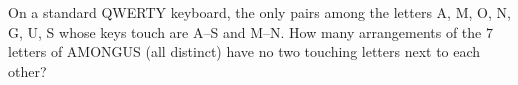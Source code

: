 On a standard QWERTY keyboard, the only pairs among the letters A, M, O, N, G, U, S whose keys touch are A--S and M--N. How many arrangements of the $7$ letters of AMONGUS (all distinct) have no two touching letters next to each other?
